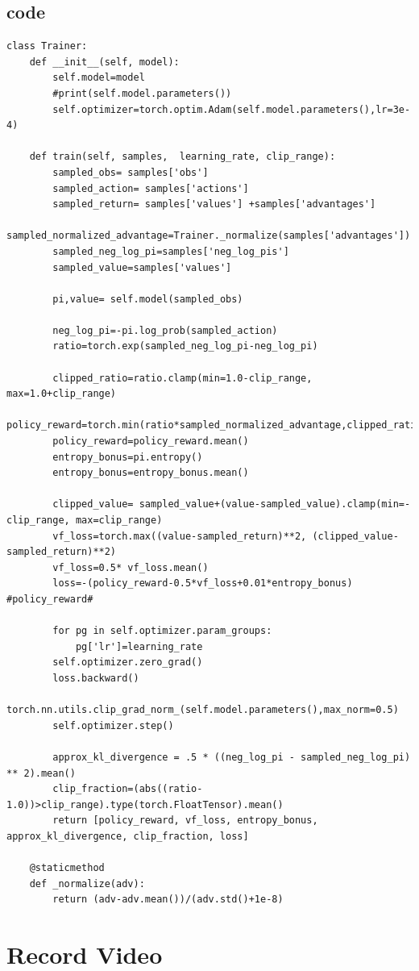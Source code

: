 \documentclass[12pt]{extarticle}
\begin{document}
\subsection{code}
\begin{lstlisting}
class Trainer:
	def __init__(self, model):
		self.model=model
		#print(self.model.parameters())
		self.optimizer=torch.optim.Adam(self.model.parameters(),lr=3e-4)

	def train(self, samples,  learning_rate, clip_range):
		sampled_obs= samples['obs']
		sampled_action= samples['actions']
		sampled_return= samples['values'] +samples['advantages']
		sampled_normalized_advantage=Trainer._normalize(samples['advantages'])
		sampled_neg_log_pi=samples['neg_log_pis']
		sampled_value=samples['values']

		pi,value= self.model(sampled_obs)

		neg_log_pi=-pi.log_prob(sampled_action)
		ratio=torch.exp(sampled_neg_log_pi-neg_log_pi)

		clipped_ratio=ratio.clamp(min=1.0-clip_range, max=1.0+clip_range)
		policy_reward=torch.min(ratio*sampled_normalized_advantage,clipped_ratio*sampled_normalized_advantage)
		policy_reward=policy_reward.mean()
		entropy_bonus=pi.entropy()
		entropy_bonus=entropy_bonus.mean()

		clipped_value= sampled_value+(value-sampled_value).clamp(min=-clip_range, max=clip_range)
		vf_loss=torch.max((value-sampled_return)**2, (clipped_value-sampled_return)**2)
		vf_loss=0.5* vf_loss.mean()
		loss=-(policy_reward-0.5*vf_loss+0.01*entropy_bonus) #policy_reward#

		for pg in self.optimizer.param_groups:
			pg['lr']=learning_rate
		self.optimizer.zero_grad()
		loss.backward()
		torch.nn.utils.clip_grad_norm_(self.model.parameters(),max_norm=0.5)
		self.optimizer.step()

		approx_kl_divergence = .5 * ((neg_log_pi - sampled_neg_log_pi) ** 2).mean()
		clip_fraction=(abs((ratio-1.0))>clip_range).type(torch.FloatTensor).mean()
		return [policy_reward, vf_loss, entropy_bonus, approx_kl_divergence, clip_fraction, loss]

	@staticmethod
	def _normalize(adv):
		return (adv-adv.mean())/(adv.std()+1e-8)

\end{lstlisting}
 

\section{Record Video}
\end{document}
